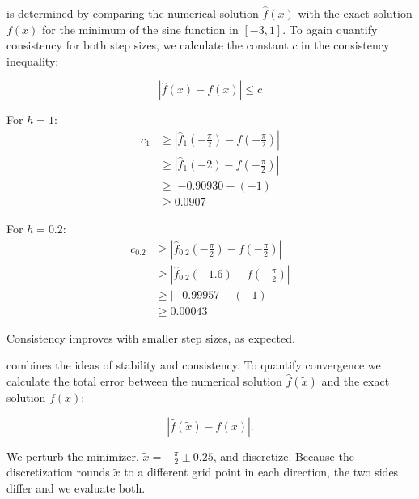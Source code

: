 
 is determined by comparing the numerical solution $\hat{f}(x)$ with the exact solution $f(x)$ for the minimum of the sine function in $[-3,1]$.
To again quantify consistency for both step sizes, we calculate the constant $c$ in the consistency inequality:

\begin{equation}
    \left| \hat{f}(x) - f(x) \right| \leq c
\end{equation}


For $h=1$:
\begin{align*}
    c_1 &\geq \left| \hat{f}_1(-\frac{\pi}{2}) - f(-\frac{\pi}{2}) \right| \\
    &\geq \left| \hat{f}_{1}(-2) - f(-\frac{\pi}{2}) \right| \\
    &\geq \left| -0.90930 - (-1) \right| \\
    &\geq 0.0907
\end{align*}


For $h=0.2$:
\begin{align*}
    c_{0.2} &\geq \left| \hat{f}_{0.2}(-\frac{\pi}{2}) - f(-\frac{\pi}{2}) \right| \\
    &\geq \left| \hat{f}_{0.2}(-1.6) - f(-\frac{\pi}{2}) \right| \\
    &\geq \left| -0.99957 - (-1) \right| \\
    &\geq 0.00043
\end{align*}

Consistency improves with smaller step sizes, as expected.




 combines the ideas of stability and consistency.
To quantify convergence we calculate the total error between the numerical solution $\hat{f}(\tilde{x})$ and the exact solution $f(x)$:

\begin{equation}
    \left| \hat{f}(\tilde{x}) - f(x) \right|.
\end{equation}

\vspace{1em}
We perturb the minimizer, $\tilde{x} = -\frac{\pi}{2} \pm 0.25$, and discretize. Because the discretization rounds $\tilde{x}$ 
to a different grid point in each direction, the two sides differ and we evaluate both.


